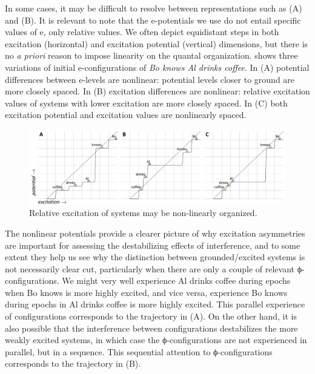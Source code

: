    In some cases, it may be difficult to resolve between representations such as (A) and (B). It is relevant to note that the e-potentials we use do not entail specific values of e, only relative values. We often depict equidistant steps in both excitation (horizontal) and excitation potential (vertical) dimensions, but there is no {\textit{a priori}} reason to impose linearity on the quantal organization. {} shows three variations of initial e-configurations of \textit{Bo knows Al drinks coffee}. In (A) potential differences between e-levels are nonlinear: potential levels closer to ground are more closely spaced. In (B) excitation differences are nonlinear: relative excitation values of systems with lower excitation are more closely spaced. In (C) both excitation potential and excitation values are nonlinearly spaced.

  
\begin{figure}
\includegraphics[width=\textwidth]{figures/Tilsen-img96.png}
\caption{Relative excitation of systems may be non-linearly organized.}
\label{fig:4:46}
\end{figure}
   

  The nonlinear potentials provide a clearer picture of why excitation asymmetries are important for assessing the destabilizing effects of interference, and to some extent they help us see why the distinction between grounded/excited systems is not necessarily clear cut, particularly when there are only a couple of relevant ϕ-configurations. We might very well experience {\textbar}Al drinks coffee{\textbar} during epochs when {\textbar}Bo knows{\textbar} is more highly excited, and vice versa, experience {\textbar}Bo knows{\textbar} during epochs in {\textbar}Al drinks coffee{\textbar} is more highly excited. This parallel experience of configurations corresponds to the trajectory in {}(A). On the other hand, it is also possible that the interference between configurations destabilizes the more weakly excited systems, in which case the ϕ-configurations are not experienced in parallel, but in a sequence. This sequential attention to ϕ-configurations corresponds to the trajectory in {}(B).

